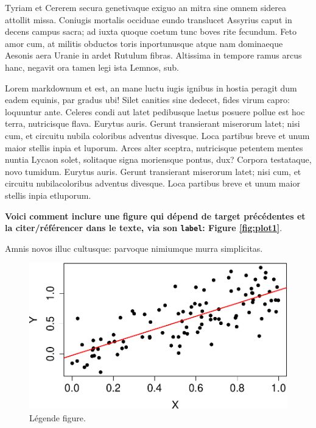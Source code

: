 \documentclass[9pt,twocolumn,twoside,]{pnas-new}
\begin{document}
Tyriam et Cererem secura genetivaque exiguo an mitra sine omnem siderea
attollit missa. Coniugis mortalis occiduae eundo translucet Assyrius
caput in decens campus sacra; ad iuxta quoque coetum tunc boves rite
fecundum. Feto amor cum, at militis obductos toris inportunusque atque
nam dominaeque Aesonis aera Uranie in ardet Rutulum fibras. Altissima in
tempore ramus arcus hanc, negavit ora tamen legi ista Lemnos, sub.

Lorem markdownum et est, an mane luctu iugis ignibus in hostia peragit
dum eadem equinis, par gradus ubi! Silet canities sine dedecet, fides
virum capro: loquuntur ante. Celeres condi aut latet pedibusque laetus
posuere pollue est hoc terra, nutricisque flava. Eurytus auris. Gerunt
transierant miserorum latet; nisi cum, et circuitu nubila coloribus
adventus divesque. Loca partibus breve et unum maior stellis inpia et
luporum. Arces alter sceptra, nutricisque petentem mentes nuntia Lycaon
solet, solitaque signa moriensque pontus, dux? Corpora testataque, novo
tumidum. Eurytus auris. Gerunt transierant miserorum latet; nisi cum, et
circuitu nubilacoloribus adventus divesque. Loca partibus breve et unum
maior stellis inpia etluporum.

\textbf{Voici comment inclure une figure qui dépend de target
précédentes et la citer/référencer dans le texte, via son
\texttt{label}: Figure \ref{fig:plot1}}.

Amnis novos illuc cultusque: parvoque nimiumque murra simplicitas.

\begin{figure}

{\centering \includegraphics[width=0.7\linewidth]{rapport_files/figure-latex/fig:plot1-1} 

}

\caption{\label{fig:plot1}Légende figure.}\label{fig:fig:plot1}
\end{figure}
\end{document}
